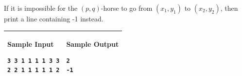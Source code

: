 If it is impossible for the $(p,q)$-horse to go from $(x_1,y_1)$ to
$(x_2,y_2)$, then print a line containing -1 instead.


\begin{table}[!h]
\centering
\begin{tabular}{|l|l|}
\hline
\begin{minipage}[t]{3in}
\textbf{Sample Input}
\begin{verbatim}
3 3 1 1 1 1 3 3
2 2 1 1 1 1 1 2
\end{verbatim}
\vspace{1mm}
\end{minipage}
&

\begin{minipage}[t]{3in}
\textbf{Sample Output}
\begin{verbatim}
2
-1
\end{verbatim}
\vspace{1mm}
\end{minipage} \\
\hline
\end{tabular}
\end{table}

\newpage
